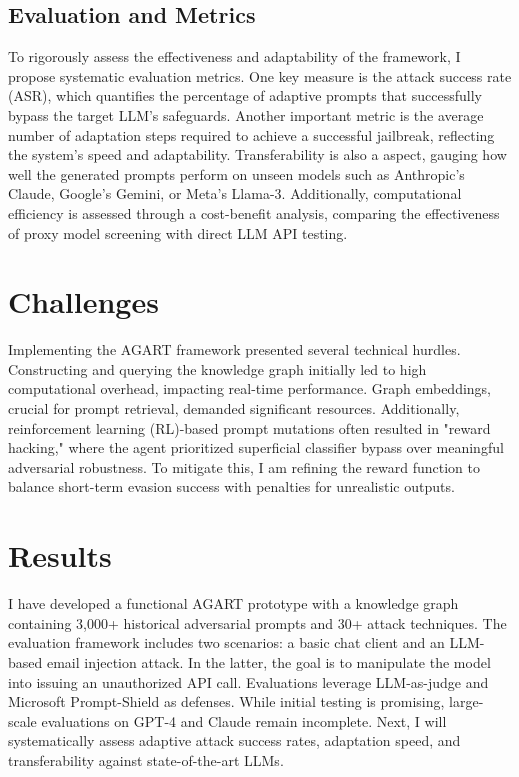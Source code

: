 \documentclass[manuscript,screen,review]{acmart}
\begin{document}
\subsection{Evaluation and Metrics}

To rigorously assess the effectiveness and adaptability of the framework, I propose systematic evaluation metrics. One key measure is the attack success rate (ASR), which quantifies the percentage of adaptive prompts that successfully bypass the target LLM’s safeguards. Another important metric is the average number of adaptation steps required to achieve a successful jailbreak, reflecting the system’s speed and adaptability. Transferability is also a aspect, gauging how well the generated prompts perform on unseen models such as Anthropic’s Claude, Google’s Gemini, or Meta’s Llama-3. Additionally, computational efficiency is assessed through a cost-benefit analysis, comparing the effectiveness of proxy model screening with direct LLM API testing.

\section{Challenges}

Implementing the AGART framework presented several technical hurdles. Constructing and querying the knowledge graph initially led to high computational overhead, impacting real-time performance. Graph embeddings, crucial for prompt retrieval, demanded significant resources. Additionally, reinforcement learning (RL)-based prompt mutations often resulted in "reward hacking," where the agent prioritized superficial classifier bypass over meaningful adversarial robustness. To mitigate this, I am refining the reward function to balance short-term evasion success with penalties for unrealistic outputs.

\section{Results}

I have developed a functional AGART prototype with a knowledge graph containing 3,000+ historical adversarial prompts and 30+ attack techniques. The evaluation framework includes two scenarios: a basic chat client and an LLM-based email injection attack. In the latter, the goal is to manipulate the model into issuing an unauthorized API call. Evaluations leverage LLM-as-judge and Microsoft Prompt-Shield as defenses. While initial testing is promising, large-scale evaluations on GPT-4 and Claude remain incomplete. Next, I will systematically assess adaptive attack success rates, adaptation speed, and transferability against state-of-the-art LLMs.
\end{document}
